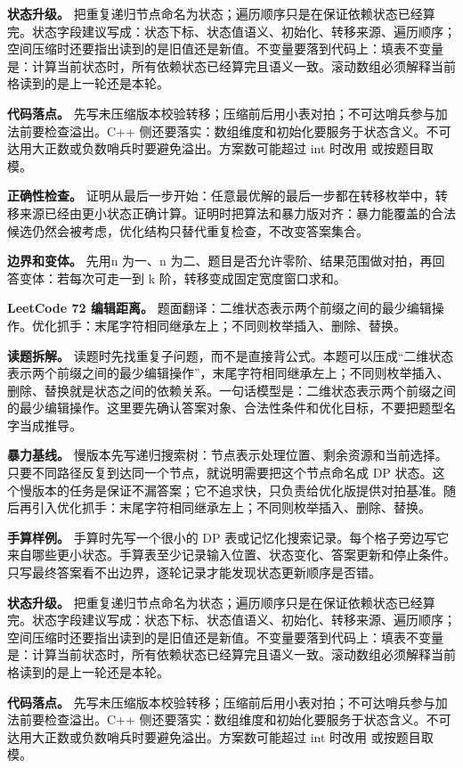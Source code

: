 \textbf{状态升级。} 把重复递归节点命名为状态；遍历顺序只是在保证依赖状态已经算完。状态字段建议写成：状态下标、状态值语义、初始化、转移来源、遍历顺序；空间压缩时还要指出读到的是旧值还是新值。不变量要落到代码上：填表不变量是：计算当前状态时，所有依赖状态已经算完且语义一致。滚动数组必须解释当前格读到的是上一轮还是本轮。

\textbf{代码落点。} 先写未压缩版本校验转移；压缩前后用小表对拍；不可达哨兵参与加法前要检查溢出。C++ 侧还要落实：数组维度和初始化要服务于状态含义。不可达用大正数或负数哨兵时要避免溢出。方案数可能超过 int 时改用  或按题目取模。

\textbf{正确性检查。} 证明从最后一步开始：任意最优解的最后一步都在转移枚举中，转移来源已经由更小状态正确计算。证明时把算法和暴力版对齐：暴力能覆盖的合法候选仍然会被考虑，优化结构只替代重复检查，不改变答案集合。

\textbf{边界和变体。} 先用n 为一、n 为二、题目是否允许零阶、结果范围做对拍，再回答变体：若每次可走一到 k 阶，转移变成固定宽度窗口求和。

\noindent\textbf{LeetCode 72 编辑距离。} 题面翻译：二维状态表示两个前缀之间的最少编辑操作。优化抓手：末尾字符相同继承左上；不同则枚举插入、删除、替换。

\textbf{读题拆解。} 读题时先找重复子问题，而不是直接背公式。本题可以压成“二维状态表示两个前缀之间的最少编辑操作”，末尾字符相同继承左上；不同则枚举插入、删除、替换就是状态之间的依赖关系。一句话模型是：二维状态表示两个前缀之间的最少编辑操作。这里要先确认答案对象、合法性条件和优化目标，不要把题型名字当成推导。

\textbf{暴力基线。} 慢版本先写递归搜索树：节点表示处理位置、剩余资源和当前选择。只要不同路径反复到达同一个节点，就说明需要把这个节点命名成 DP 状态。这个慢版本的任务是保证不漏答案；它不追求快，只负责给优化版提供对拍基准。随后再引入优化抓手：末尾字符相同继承左上；不同则枚举插入、删除、替换。

\textbf{手算样例。} 手算时先写一个很小的 DP 表或记忆化搜索记录。每个格子旁边写它来自哪些更小状态。手算表至少记录输入位置、状态变化、答案更新和停止条件。只写最终答案看不出边界，逐轮记录才能发现状态更新顺序是否错。

\textbf{状态升级。} 把重复递归节点命名为状态；遍历顺序只是在保证依赖状态已经算完。状态字段建议写成：状态下标、状态值语义、初始化、转移来源、遍历顺序；空间压缩时还要指出读到的是旧值还是新值。不变量要落到代码上：填表不变量是：计算当前状态时，所有依赖状态已经算完且语义一致。滚动数组必须解释当前格读到的是上一轮还是本轮。

\textbf{代码落点。} 先写未压缩版本校验转移；压缩前后用小表对拍；不可达哨兵参与加法前要检查溢出。C++ 侧还要落实：数组维度和初始化要服务于状态含义。不可达用大正数或负数哨兵时要避免溢出。方案数可能超过 int 时改用  或按题目取模。

